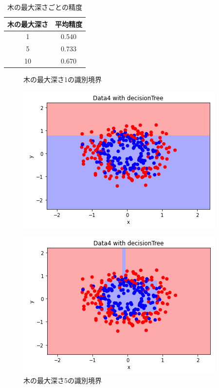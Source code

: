 \begin{table}[hbtp]
  \centering
  \caption{木の最大深さごとの精度}
  \label{table:7}
  \begin{tabular}{|c|c|}
    \hline
    木の最大深さ&平均精度\\
    \hline
    1&0.540 \\
    5&0.733  \\
    10&0.670  \\
    \hline
  \end{tabular}
\end{table}
\begin{figure}[htbp]
  \begin{minipage}[t]{0.33\hsize}
    \centering
    \caption{木の最大深さ1の識別境界}
    \label{graph:11}
    \includegraphics[keepaspectratio, scale=0.5]{3-2-1.PNG}
  \end{minipage}
  \begin{minipage}[t]{0.33\hsize}
    \centering
    \caption{木の最大深さ5の識別境界}
    \label{graph:12}
    \includegraphics[keepaspectratio, scale=0.5]{3-2-5.PNG}
  \end{minipage}
  \begin{minipage}[t]{0.33\hsize}

\end{minipage}
\end{figure}
